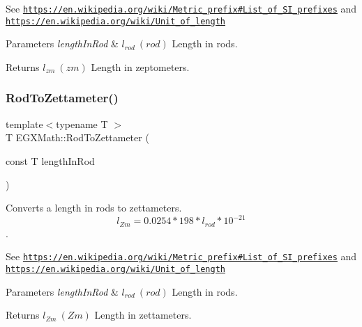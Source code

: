 See \href{https://en.wikipedia.org/wiki/Metric_prefix#List_of_SI_prefixes}{\tt https\+://en.\+wikipedia.\+org/wiki/\+Metric\+\_\+prefix\#\+List\+\_\+of\+\_\+\+S\+I\+\_\+prefixes} and \href{https://en.wikipedia.org/wiki/Unit_of_length}{\tt https\+://en.\+wikipedia.\+org/wiki/\+Unit\+\_\+of\+\_\+length} 
\begin{DoxyParams}{Parameters}
{\em length\+In\+Rod} & $ l_{rod}\ (rod)$ Length in rods. \\
\hline
\end{DoxyParams}
\begin{DoxyReturn}{Returns}
$ l_{zm}\ (zm)$ Length in zeptometers. 
\end{DoxyReturn}
\mbox{\label{group___e_g_x_math-_conversions-_length_conversions-_surveyors-_rod-_s_i_gaccf39081a4e69ba4b9384ef6f9c354d7}} 
\subsubsection{\texorpdfstring{Rod\+To\+Zettameter()}{RodToZettameter()}}
{\footnotesize\ttfamily template$<$typename T $>$ \\
T E\+G\+X\+Math\+::\+Rod\+To\+Zettameter (\begin{DoxyParamCaption}\item[{const T}]{length\+In\+Rod }\end{DoxyParamCaption})}



Converts a length in rods to zettameters. \[ l_{Zm}=0.0254 * 198 * l_{rod} * 10^{-21} \]. 

See \href{https://en.wikipedia.org/wiki/Metric_prefix#List_of_SI_prefixes}{\tt https\+://en.\+wikipedia.\+org/wiki/\+Metric\+\_\+prefix\#\+List\+\_\+of\+\_\+\+S\+I\+\_\+prefixes} and \href{https://en.wikipedia.org/wiki/Unit_of_length}{\tt https\+://en.\+wikipedia.\+org/wiki/\+Unit\+\_\+of\+\_\+length} 
\begin{DoxyParams}{Parameters}
{\em length\+In\+Rod} & $ l_{rod}\ (rod)$ Length in rods. \\
\hline
\end{DoxyParams}
\begin{DoxyReturn}{Returns}
$ l_{Zm}\ (Zm)$ Length in zettameters. 
\end{DoxyReturn}
